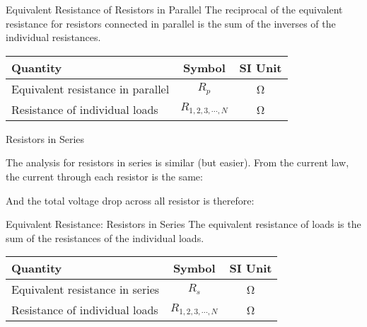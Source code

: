 \documentclass[12pt,aspectratio=169]{beamer}
\newcommand{\eq}[2]{\vspace{#1}{\Large\begin{displaymath}#2\end{displaymath}}}
\begin{document}
\begin{frame}{Equivalent Resistance of Resistors in Parallel} 
  The reciprocal of the equivalent resistance for resistors connected in
  parallel is the sum of the inverses of the individual resistances.

  \eq{-.2in}{
    \boxed{
      \frac{1}{R_p}
      =\frac{1}{R_1}+\frac{1}{R_2}+\cdots+\frac{1}{R_N}
    }
  }
  \begin{center}
    \begin{tabular}{l|c|c}
      \rowcolor{pink}
      \textbf{Quantity} & \textbf{Symbol} & \textbf{SI Unit} \\ \hline
      Equivalent resistance in parallel & $R_p$ & \si{\ohm} \\
      Resistance of individual loads    & $R_{1,2,3,\cdots,N}$ & \si{\ohm}
    \end{tabular}
  \end{center}
\end{frame}



\begin{frame}{Resistors in Series}
  \begin{center}
  \end{center}

  \vspace{.1in}The analysis for resistors in series is similar (but easier).
  From the current law, the current through each resistor is the same:

  \eq{-.2in}{I_1=I_2=I_3=\cdots=I}

  \vspace{-.15in}And the total voltage drop across all resistor is therefore:

  \eq{-.2in}{
    V=V_1+V_2+V_3+\cdots=I(R_1+R_2+R_3+\cdots)
  }
\end{frame}



\begin{frame}{Equivalent Resistance: Resistors in Series}
  The equivalent resistance of loads is the sum of the resistances of the
  individual loads.
  
  \eq{-.2in}{
    \boxed{R_s=\sum_{i=1}^{N}R_i}
  }
  \begin{center}
    \begin{tabular}{l|c|c}
      \rowcolor{pink}
      \textbf{Quantity} & \textbf{Symbol} & \textbf{SI Unit} \\ \hline
      Equivalent resistance in series & $R_s$ & \si{\ohm} \\
      Resistance of individual loads & $R_{1,2,3,\cdots,N}$ & \si{\ohm}
    \end{tabular}
  \end{center}
\end{frame}
\end{document}
